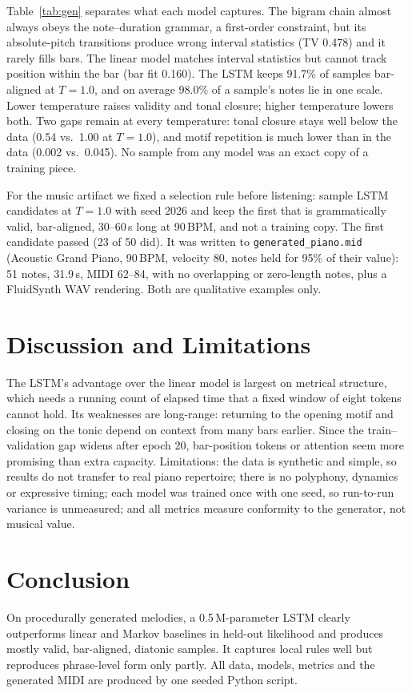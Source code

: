 \documentclass[conference]{IEEEtran}
\begin{document}
Table~\ref{tab:gen} separates what each model captures. The bigram chain almost always obeys
the note--duration grammar, a first-order constraint, but its absolute-pitch transitions
produce wrong interval statistics (TV 0.478) and it rarely fills bars. The linear model matches
interval statistics but cannot track position within the bar (bar fit 0.160). The LSTM keeps
91.7\% of samples bar-aligned at $T{=}1.0$, and on average 98.0\% of a sample's notes lie in one scale. Lower
temperature raises validity and tonal closure; higher temperature lowers both. Two gaps
remain at every temperature: tonal closure stays well below the data (0.54 vs.\ 1.00 at
$T{=}1.0$), and motif repetition is much lower than in the data (0.002 vs.\ 0.045). No sample
from any model was an exact copy of a training piece.

For the music artifact we fixed a selection rule before listening: sample LSTM candidates at
$T{=}1.0$ with seed 2026 and keep the first that is grammatically valid, bar-aligned,
30--60\,s long at 90\,BPM, and not a training copy. The first candidate passed (23 of 50 did).
It was written to \texttt{generated\_piano.mid} (Acoustic Grand Piano, 90\,BPM, velocity 80,
notes held for 95\% of their value): 51 notes, 31.9\,s, MIDI 62--84, with no overlapping or
zero-length notes, plus a FluidSynth WAV rendering. Both are qualitative examples only.

\section{Discussion and Limitations}
The LSTM's advantage over the linear model is largest on metrical structure, which needs a
running count of elapsed time that a fixed window of eight tokens cannot hold. Its weaknesses
are long-range: returning to the opening motif and closing on the tonic depend on context
from many bars earlier. Since the train--validation gap widens after epoch 20, bar-position tokens or attention seem
more promising than extra capacity. Limitations: the data is synthetic and simple, so results do not
transfer to real piano repertoire; there is no polyphony, dynamics or expressive timing; each
model was trained once with one seed, so run-to-run variance is unmeasured; and all metrics
measure conformity to the generator, not musical value.

\section{Conclusion}
On procedurally generated melodies, a 0.5\,M-parameter LSTM clearly outperforms linear and
Markov baselines in held-out likelihood and produces mostly valid, bar-aligned, diatonic
samples. It captures local rules well but reproduces phrase-level form only partly. All data,
models, metrics and the generated MIDI are produced by one seeded Python script.
\end{document}

